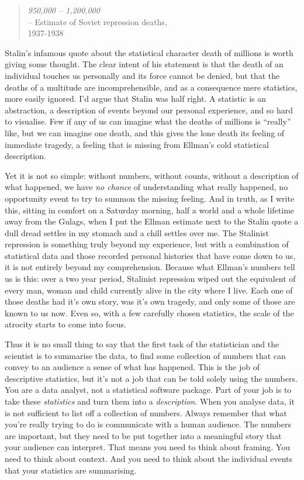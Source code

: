 \begin{quote}
{\it 950,000 -- 1,200,000} \\
\hspace*{2cm} -- Estimate of Soviet repression deaths, \\ \hspace*{2.3cm} 1937-1938 \cite{Ellman2002}
\end{quote}


Stalin's infamous quote about the statistical character death of millions is worth giving some thought. The clear intent of his statement is that the death of an individual touches us personally and its force cannot be denied, but that the deaths of a multitude are incomprehensible, and as a consequence mere statistics, more easily ignored. I'd argue that Stalin was half right. A statistic is an abstraction, a description of events beyond our personal experience, and so hard to visualise. Few if any of us can imagine what the deaths of millions is ``really'' like, but we can imagine one death, and this gives the lone death its feeling of immediate tragedy, a feeling that is missing from Ellman's cold statistical description.

Yet it is not so simple: without numbers, without counts, without a description of what happened, we have {\it no chance} of understanding what really happened, no opportunity event to try to summon the missing feeling. And in truth, as I write this, sitting in comfort on a Saturday morning, half a world and a whole lifetime away from the Gulags, when I put the Ellman estimate next to the Stalin quote a dull dread settles in my stomach and a chill settles over me. The Stalinist repression is something truly beyond my experience, but with a combination of statistical data and those recorded personal histories that have come down to us, it is not entirely beyond my comprehension. Because what Ellman's numbers tell us is this: over a two year period, Stalinist repression wiped out the equivalent of every man, woman and child currently alive in the city where I live. Each one of those deaths had it's own story, was it's own tragedy, and only some of those are known to us now. Even so, with a few carefully chosen statistics, the scale of the atrocity starts to come into focus.  

Thus it is no small thing to say that the first task of the statistician and the scientist is to summarise the data, to find some collection of numbers that can convey to an audience a sense of what has happened. This is the job of descriptive statistics, but it's not a job that can be told solely using the numbers. You are a data analyst, not a statistical software package. Part of your job is to take these {\it statistics} and turn them into a {\it description}. When you analyse data, it is not sufficient to list off a collection of numbers. Always remember that what you're really trying to do is communicate with a human audience. The numbers are important, but they need to be put together into a meaningful story that your audience can interpret. That means you need to think about framing. You need to think about context. And you need to think about the individual events that your statistics are summarising. 


